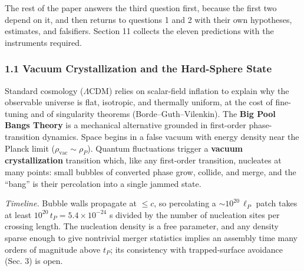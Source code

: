 \documentclass[
]{article}
\begin{document}
The rest of the paper answers the third question first, because the
first two depend on it, and then returns to questions 1 and 2 with their
own hypotheses, estimates, and falsifiers. Section 11 collects the
eleven predictions with the instruments required.

\hypertarget{vacuum-crystallization-and-the-hard-sphere-state}{%
\subsubsection{\texorpdfstring{\textbf{1.1 Vacuum Crystallization and
the Hard-Sphere
State}}{1.1 Vacuum Crystallization and the Hard-Sphere State}}\label{vacuum-crystallization-and-the-hard-sphere-state}}

Standard cosmology (\(\Lambda\)CDM) relies on scalar-field inflation to
explain why the observable universe is flat, isotropic, and thermally
uniform, at the cost of fine-tuning and of singularity theorems
(Borde--Guth--Vilenkin). The \textbf{Big Pool Bangs Theory} is a
mechanical alternative grounded in first-order phase-transition
dynamics. Space begins in a false vacuum with energy density near the
Planck limit (\(\rho_{\text{vac}} \sim \rho_P\)). Quantum fluctuations
trigger a \textbf{vacuum crystallization} transition which, like any
first-order transition, nucleates at many points: small bubbles of
converted phase grow, collide, and merge, and the ``bang'' is their
percolation into a single jammed state.

\emph{Timeline.} Bubble walls propagate at \(\leq c\), so percolating a
\(\sim\!10^{20}\,\ell_P\) patch takes at least
\(10^{20}\,t_P = 5.4\times10^{-24}\) s divided by the number of
nucleation sites per crossing length. The nucleation density is a free
parameter, and any density sparse enough to give nontrivial merger
statistics implies an assembly time many orders of magnitude above
\(t_P\); its consistency with trapped-surface avoidance (Sec. 3) is
open.
\end{document}
